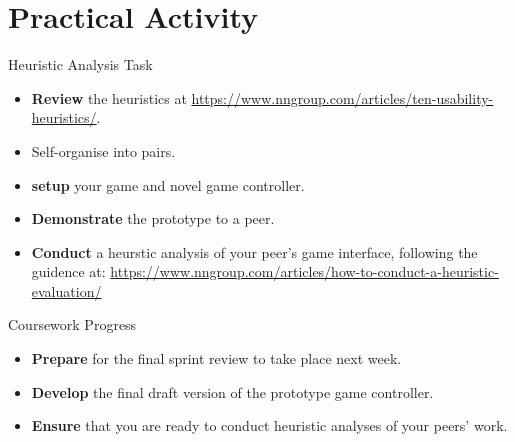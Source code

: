 \documentclass[xcolor={dvipsnames}]{beamer}\usepackage{etoolbox}\newtoggle{printable}\togglefalse{printable}
\begin{document}
\part{Practical Activity}
\frame{\partpage}

\begin{frame}{Heuristic Analysis Task}
	\begin{itemize}
		\item \textbf{Review} the heuristics at \url{https://www.nngroup.com/articles/ten-usability-heuristics/}.
		\item Self-organise into pairs.
		\item \textbf{setup} your game and novel game controller.
		\item \textbf{Demonstrate} the prototype to a peer.
		\item \textbf{Conduct} a heurstic analysis of your peer's game interface, following the guidence at:
		\url{https://www.nngroup.com/articles/how-to-conduct-a-heuristic-evaluation/}
	\end{itemize}
\end{frame}

\begin{frame}{Coursework Progress}
	\begin{itemize}
		\item \textbf{Prepare} for the final sprint review to take place next week.
		\item \textbf{Develop} the final draft version of the prototype game controller. 
		\item \textbf{Ensure} that you are ready to conduct heuristic analyses of your peers' work. 
	\end{itemize}
\end{frame}


%
\end{document}
